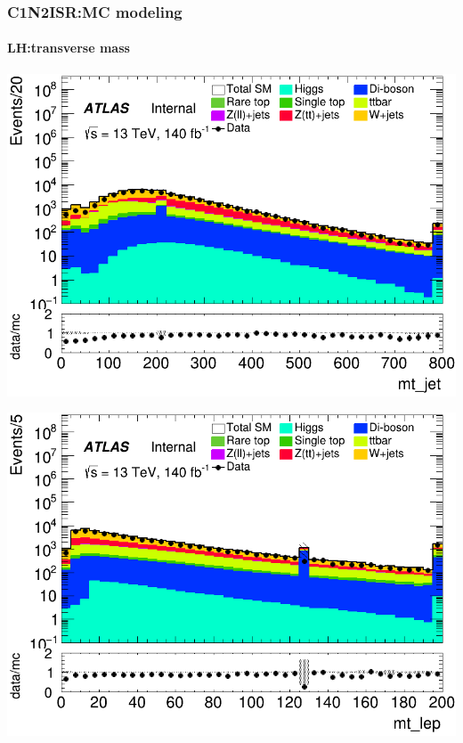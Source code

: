 \documentclass[usenames,dvipsnames]{beamer}
\begin{document}
\begin{frame}
\frametitle{C1N2ISR:MC modeling}
\framesubtitle{LH:\quad transverse mass}
    \begin{minipage}{0.32\textwidth}
        \centering
        \includegraphics[width=\textwidth]{graphics/LH_met/LH_met_mt_jet.png}
    \end{minipage}
    \hfill
    \begin{minipage}{0.32\textwidth}
        \centering
        \includegraphics[width=\textwidth]{graphics/LH_met/LH_met_mt_lep.png}
    \end{minipage}
    \hfill
    \begin{minipage}{0.32\textwidth}
        \centering

\end{minipage}
\end{frame}
\end{document}

